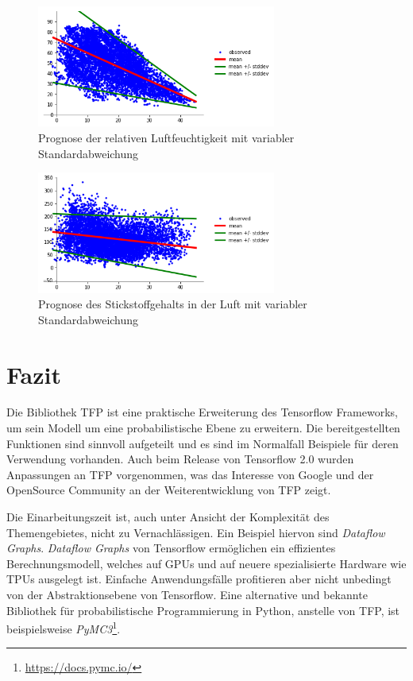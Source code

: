 \documentclass[12pt]{article}
\begin{document}
\begin{figure}[h]
    \centering
    \includegraphics[width=0.7\textwidth]{./figs/with_unc_rh.png}
    \caption{Prognose der relativen Luftfeuchtigkeit mit variabler Standardabweichung}
    \label{fig:with_unc_rh}
\end{figure}

\begin{figure}[h]
    \centering
    \includegraphics[width=0.7\textwidth]{./figs/with_unc_no2.png}
    \caption{Prognose des Stickstoffgehalts in der Luft mit variabler Standardabweichung}
    \label{fig:with_unc_no2}
\end{figure}


\section{Fazit}

Die Bibliothek TFP ist eine praktische Erweiterung des Tensorflow Frameworks, um sein Modell um eine probabilistische Ebene zu erweitern. Die bereitgestellten Funktionen sind sinnvoll aufgeteilt und es sind im Normalfall Beispiele für deren Verwendung vorhanden. Auch beim Release von Tensorflow 2.0 wurden Anpassungen an TFP vorgenommen, was das Interesse von Google und der OpenSource Community an der Weiterentwicklung von TFP zeigt. 

Die Einarbeitungszeit ist, auch unter Ansicht der Komplexität des Themengebietes, nicht zu Vernachlässigen. Ein Beispiel hiervon sind \textit{Dataflow Graphs}. \textit{Dataflow Graphs} von Tensorflow ermöglichen ein effizientes Berechnungsmodell, welches auf GPUs und auf neuere spezialisierte Hardware wie TPUs ausgelegt ist. Einfache Anwendungsfälle profitieren aber nicht unbedingt von der Abstraktionsebene von Tensorflow. Eine alternative und bekannte Bibliothek für probabilistische Programmierung in Python, anstelle von TFP, ist beispielsweise \textit{PyMC3}\footnote{\url{https://docs.pymc.io/}}.
\end{document}
